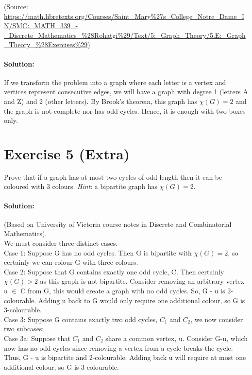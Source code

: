 \documentclass{article}
\begin{document}
\noindent
(Source: \url {https://math.libretexts.org/Courses/Saint_Mary%27s_College_Notre_Dame_IN/SMC:_MATH_339_-_Discrete_Mathematics_%28Rohatgi%29/Text/5:_Graph_Theory/5.E:_Graph_Theory_%28Exercises%29})

\paragraph{Solution:}
If we transform the problem into a graph where each letter is a vertex and vertices represent consecutive edges, we will have a graph with degree 1 (letters A and Z) and 2 (other letters). By Brook's theorem, this graph has $\chi(G) = 2$ and the graph is not complete nor has odd cycles. Hence, it is enough with two boxes only.

\section*{Exercise 5 (Extra)}
Prove that if a graph has at most two cycles of odd length then it can be
coloured with 3 colours. \textit{Hint}: a bipartite graph has $\chi(G) = 2$.

\paragraph{Solution:}
(Based on University of Victoria course notes in Discrete and Combinatorial Mathematics).\\

\noindent
We must consider three distinct cases.\\

\noindent
Case 1: Suppose G has no odd cycles. Then G is bipartite with $\chi(G) = 2$, so
certainly we can colour G with three colours.\\

\noindent
Case 2: Suppose that G contains exactly one odd cycle, C. Then certainly
$\chi(G) > 2$ as this graph is not bipartite. Consider removing an arbitrary vertex
u $\in$ C from G, this would create a graph with no odd cycles. So, G - u is
2-colourable. Adding u back to G would only require one additional colour, so G is 3-colourable.\\

\noindent
Case 3: Suppose G contains exactly two odd cycles, $C_1$ and $C_2$, we now consider
two subcases:\\

Case 3a: Suppose that $C_1$ and $C_2$ share a common vertex, u. Consider
G-u, which now has no odd cycles since removing a vertex from
a cycle breaks the cycle. Thus, G - u is bipartite and 2-colourable.
Adding back u will require at most one additional colour, so G is
3-colourable.\\
\end{document}
